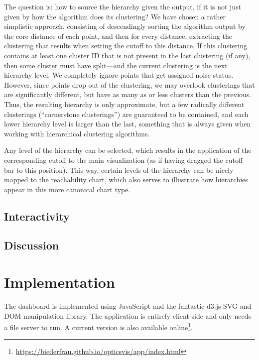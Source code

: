 \documentclass{vgtc} %
\begin{document}
The question is: how to source the hierarchy given the output, if it is not
just given by how the algorithm does its clustering? We have chosen a rather
simplistic approach, consisting of descendingly sorting the algorithm output by
the core distance of each point, and then for every distance, extracting the
clustering that results when setting the cutoff to this distance. If this
clustering contains at least one cluster ID that is not present in the last
clustering (if any), then some cluster must have split---and the current
clustering is the next hierarchy level. We completely ignore points that get
assigned noise status. However, since points drop out of the clustering, we
may overlook clusterings that are significantly different, but have as many as
or less clusters than the previous. Thus, the resulting hierarchy is only
approximate, but a few radically different clusterings (``cornerstone
clusterings'') are guaranteed to be contained, and each lower hierarchy level
is larger than the last, something that is always given when working with
hierarchical clustering algorithms.

Any level of the hierarchy can be selected, which results in the application of
the corresponding cutoff to the main visualization (as if having dragged the
cutoff bar to this position). This way, certain levels of the hierarchy can be
nicely mapped to the reachability chart, which also serves to illustrate how
hierarchies appear in this more canonical chart type.

\subsection{Interactivity}

\subsection{Discussion}



\section{Implementation} %

The dashboard is implemented using JavaScript and the fantastic d3.js SVG and DOM
manipulation library. The application is entirely client-side and only needs a
file server to run. A current version is also available
online\footnote{\url{https://biederfrau.github.io/opticsvis/app/index.html}}.
\end{document}
